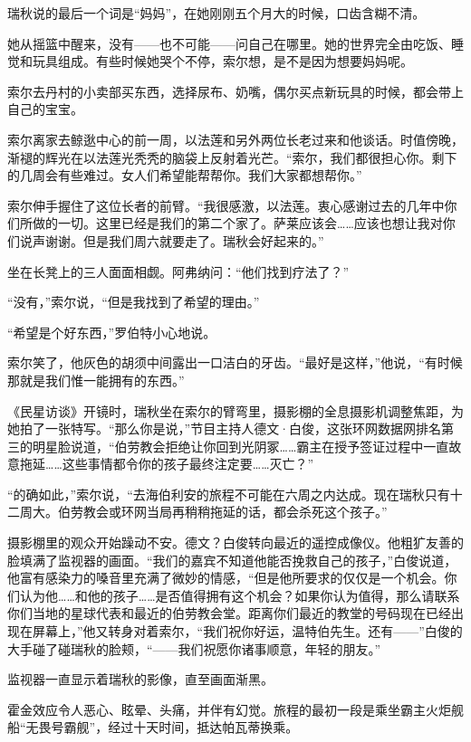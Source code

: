 \documentclass[AutoFakeBold=true]{book}
\begin{document}
\vspace*{1em}

瑞秋说的最后一个词是``妈妈''，在她刚刚五个月大的时候，口齿含糊不清。

她从摇篮中醒来，没有——也不可能——问自己在哪里。她的世界完全由吃饭、睡觉和玩具组成。有些时候她哭个不停，索尔想，是不是因为想要妈妈呢。

索尔去丹村的小卖部买东西，选择尿布、奶嘴，偶尔买点新玩具的时候，都会带上自己的宝宝。

索尔离家去鲸逖中心的前一周，以法莲和另外两位长老过来和他谈话。时值傍晚，渐褪的辉光在以法莲光秃秃的脑袋上反射着光芒。``索尔，我们都很担心你。剩下的几周会有些难过。女人们希望能帮帮你。我们大家都想帮你。''

索尔伸手握住了这位长者的前臂。``我很感激，以法莲。衷心感谢过去的几年中你们所做的一切。这里已经是我们的第二个家了。萨莱应该会……应该也想让我对你们说声谢谢。但是我们周六就要走了。瑞秋会好起来的。''

坐在长凳上的三人面面相觑。阿弗纳问：``他们找到疗法了？''

``没有，''索尔说，``但是我找到了希望的理由。''

``希望是个好东西，''罗伯特小心地说。

索尔笑了，他灰色的胡须中间露出一口洁白的牙齿。``最好是这样，''他说，``有时候那就是我们惟一能拥有的东西。''

《民星访谈》开镜时，瑞秋坐在索尔的臂弯里，摄影棚的全息摄影机调整焦距，为她拍了一张特写。``那么你是说，''节目主持人德文·白俊，这张环网数据网排名第三的明星脸说道，``伯劳教会拒绝让你回到光阴冢……霸主在授予签证过程中一直故意拖延……这些事情都令你的孩子最终注定要……灭亡？''

``的确如此，''索尔说，``去海伯利安的旅程不可能在六周之内达成。现在瑞秋只有十二周大。伯劳教会或环网当局再稍稍拖延的话，都会杀死这个孩子。''

摄影棚里的观众开始躁动不安。德文？白俊转向最近的遥控成像仪。他粗犷友善的脸填满了监视器的画面。``我们的嘉宾不知道他能否挽救自己的孩子，''白俊说道，他富有感染力的嗓音里充满了微妙的情感，``但是他所要求的仅仅是一个机会。你们认为他……和他的孩子……是否值得拥有这个机会？如果你认为值得，那么请联系你们当地的星球代表和最近的伯劳教会堂。距离你们最近的教堂的号码现在已经出现在屏幕上，''他又转身对着索尔，``我们祝你好运，温特伯先生。还有——''白俊的大手碰了碰瑞秋的脸颊，``——我们祝愿你诸事顺意，年轻的朋友。''

监视器一直显示着瑞秋的影像，直至画面渐黑。

\vspace*{1em}

霍金效应令人恶心、眩晕、头痛，并伴有幻觉。旅程的最初一段是乘坐霸主火炬舰船``无畏号霸舰''，经过十天时间，抵达帕瓦蒂换乘。
\end{document}
